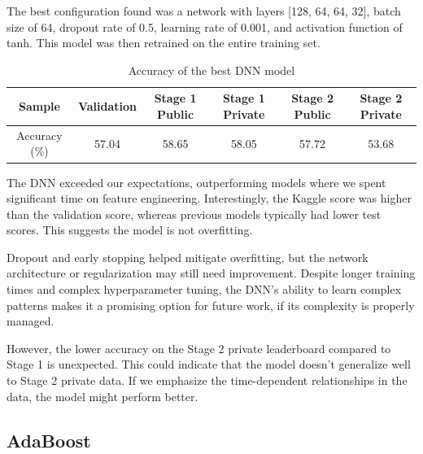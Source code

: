 \documentclass[10pt,a4paper]{article}
\begin{document}
The best configuration found was a network with layers [128, 64, 64, 32], batch size of 64, dropout rate of 0.5, learning rate of 0.001, and activation function of tanh. This model was then retrained on the entire training set.

\begin{table}[H]
  \centering
  \begin{tabular}{|c|c|c|c|c|c|}
  \hline
  Sample & Validation & Stage 1 Public & Stage 1 Private & Stage 2 Public & Stage 2 Private \\ \hline
  Accuracy (\%) & 57.04 & 58.65 & 58.05 & 57.72 & 53.68 \\ \hline
  \end{tabular}
  \caption{Accuracy of the best DNN model}
\end{table}

The DNN exceeded our expectations, outperforming models where we spent significant time on feature engineering. Interestingly, the Kaggle score was higher than the validation score, whereas previous models typically had lower test scores. This suggests the model is not overfitting.

Dropout and early stopping helped mitigate overfitting, but the network architecture or regularization may still need improvement. Despite longer training times and complex hyperparameter tuning, the DNN's ability to learn complex patterns makes it a promising option for future work, if its complexity is properly managed.

However, the lower accuracy on the Stage 2 private leaderboard compared to Stage 1 is unexpected. This could indicate that the model doesn't generalize well to Stage 2 private data. If we emphasize the time-dependent relationships in the data, the model might perform better.





\subsection{AdaBoost}
\end{document}
